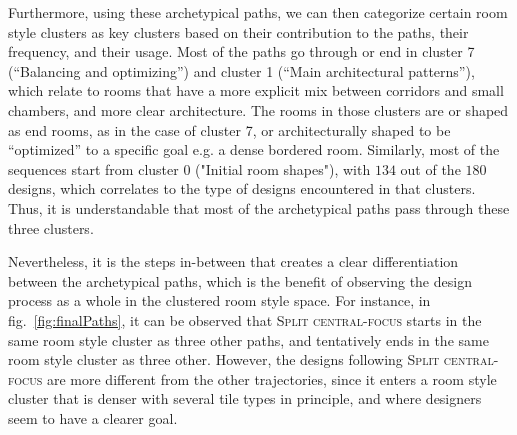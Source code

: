 Furthermore, using these archetypical paths, we can then categorize certain room style clusters as key clusters based on their contribution to the paths, their frequency, and their usage. Most of the paths go through or end in cluster 7 (``Balancing and optimizing'') and cluster 1 (``Main architectural patterns''), which relate to rooms that have a more explicit mix between corridors and small chambers, and more clear architecture. The rooms in those clusters are or shaped as end rooms, as in the case of cluster 7, or architecturally shaped to be “optimized” to a specific goal e.g. a dense bordered room. Similarly, most of the sequences start from cluster 0 ("Initial room shapes"), with $134$ out of the $180$ designs, which correlates to the type of designs encountered in that clusters. Thus, it is understandable that most of the archetypical paths pass through these three clusters. 

Nevertheless, it is the steps in-between that creates a clear differentiation between the archetypical paths, which is the benefit of observing the design process as a whole in the clustered room style space. For instance, in fig.~\ref{fig:finalPaths}, it can be observed that \textsc{Split central-focus} starts in the same room style cluster as three other paths, and tentatively ends in the same room style cluster as three other. However, the designs following \textsc{Split central-focus} are more different from the other trajectories, since it enters a room style cluster that is denser with several tile types in principle, and where designers seem to have a clearer goal.


